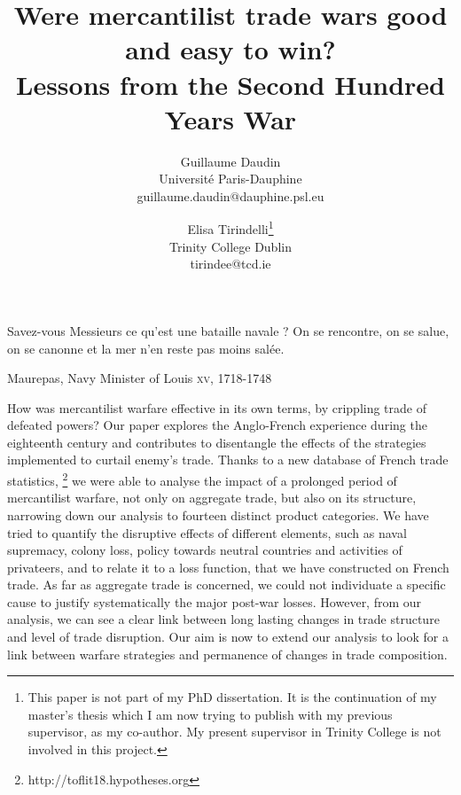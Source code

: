 \documentclass[12pt,a4paper,notitlepage]{article}
\begin{document}
\title{Were mercantilist trade wars good and easy to win?\\
Lessons from the Second Hundred Years War}
\author{
  Guillaume Daudin \\ Université Paris-Dauphine \\guillaume.daudin@dauphine.psl.eu		
  \and
  Elisa Tirindelli\footnote{This paper is not part of my PhD dissertation. It is the continuation of my master's thesis which I am now trying to publish with my previous supervisor, as my co-author. My present supervisor in Trinity College is not involved in this project.} \\ Trinity College Dublin  \\ tirindee@tcd.ie
}
\date{}
\maketitle


\epigraph{Savez-vous Messieurs ce qu’est une bataille navale ? On se rencontre, on se salue, on se canonne et la mer n’en reste pas moins salée.}{Maurepas, Navy Minister of Louis  \textsc{xv}, 1718-1748}


How was mercantilist warfare effective in its own terms, by crippling trade of defeated powers?
Our paper explores the Anglo-French experience during the eighteenth century and contributes to disentangle the effects of the strategies implemented to curtail enemy's trade. Thanks to a new database of French trade statistics,
\footnote{http://toflit18.hypotheses.org} we were able to analyse the impact of a prolonged period of mercantilist warfare, not only on aggregate trade, but also on its structure, narrowing down our analysis to fourteen distinct product categories. We have tried to quantify the disruptive effects of different elements, such as naval supremacy, colony loss, policy towards neutral countries and activities of privateers, and to relate it to a loss function, that we have constructed on French trade. As far as aggregate trade is concerned, we could not individuate a specific cause to justify systematically the major post-war losses. However, from our analysis, we can see a clear link between long lasting changes in trade structure and level of trade disruption. Our aim is now to extend our analysis to look for a link between warfare strategies and permanence of changes in trade composition.  \\
\end{document}
